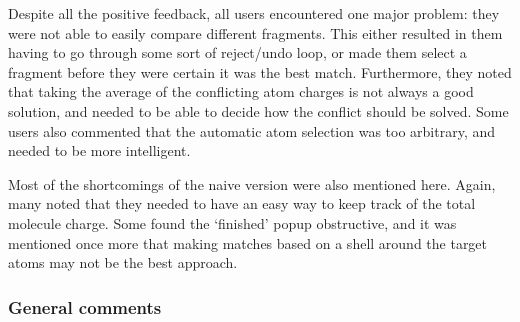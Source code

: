 Despite all the positive feedback, all users encountered one major problem: they were not able to easily compare different fragments. This either resulted in them having to go through some sort of reject/undo loop, or made them select a fragment before they were certain it was the best match. Furthermore, they noted that taking the average of the conflicting atom charges is not always a good solution, and needed to be able to decide how the conflict should be solved. Some users also commented that the automatic atom selection was too arbitrary, and needed to be more intelligent.

Most of the shortcomings of the naive version were also mentioned here. Again, many noted that they needed to have an easy way to keep track of the total molecule charge. Some found the `finished' popup obstructive, and it was mentioned once more that making matches based on a shell around the target atoms may not be the best approach.

\subsubsection{General comments}
\nlipsum
